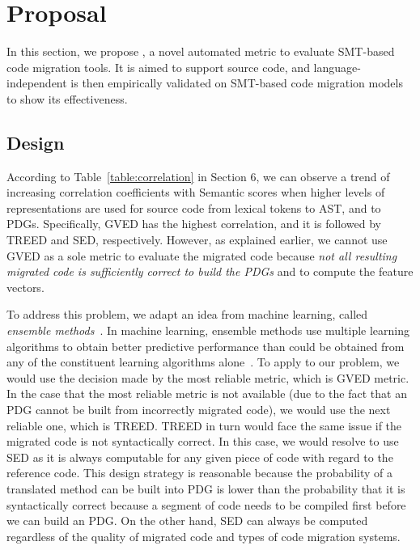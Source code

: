 \section{Proposal}
\label{sec:proposal}
In this section, we propose {\model}, a novel automated metric to
evaluate SMT-based code migration tools. It is aimed to support source
code, and language-independent
{\model} is then empirically validated on SMT-based code migration
models to show its effectiveness. 


\subsection{Design}

According to Table~\ref{table:correlation} in Section 6, we can
observe a trend of increasing correlation coefficients with Semantic
scores when higher levels of representations are used for source code
from lexical tokens to AST, and to PDGs.
%
Specifically, GVED has the highest correlation, and it is followed by
TREED and SED, respectively. 
However, as explained earlier, we cannot use GVED as a sole metric to
evaluate the migrated code because {\em not all resulting migrated
  code is sufficiently correct to build the PDGs} and to compute
the feature vectors. 

To address this problem, we adapt an idea from machine learning,
called {\em ensemble methods}~\cite{ensemble}. In machine learning,
ensemble methods use multiple learning algorithms to obtain better
predictive performance than could be obtained from any of the
constituent learning algorithms alone~\cite{ensemble}.
To apply to our problem, we would use the decision made by the most
reliable metric, which is GVED metric. In the case that the most
reliable metric is not available (due to the fact that an PDG cannot
be built from incorrectly migrated code), we would use the next
reliable one, which is TREED. TREED in turn would face the same issue
if the migrated code is not syntactically correct. In this case, we
would resolve to use SED as it is always computable for any given
piece of code with regard to the reference code. This design strategy
is reasonable because the probability of a translated method can be
built into PDG is lower than the probability that it is syntactically
correct because a segment of code needs to be compiled first before we
can build an PDG. On the other hand, SED can always be computed
regardless of the quality of migrated code and types of code migration
systems.

